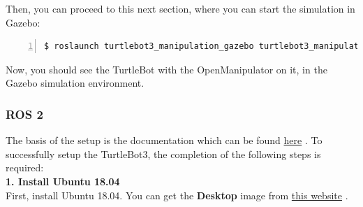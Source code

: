 \documentclass[plainarticle,zihtitle,english,final,hyperref,utf8]{zihpub}
\begin{document}
Then, you can proceed to this next section, where you can start the simulation in Gazebo:\\
\begin{Verbatim}[breaklines=true, breakanywhere=true, baselinestretch=1,fontsize=\scriptsize,numbers=left,frame=single,stepnumber=5,xleftmargin=1cm,xrightmargin=1cm]
$ roslaunch turtlebot3_manipulation_gazebo turtlebot3_manipulation_gazebo.launch
    \end{Verbatim}

Now, you should see the TurtleBot with the OpenManipulator on it, in the Gazebo simulation environment.
\newpage

\subsubsection{ROS 2}

The basis of the setup is the documentation which can be found \href{https://emanual.robotis.com/docs/en/platform/turtlebot3/ros2_setup}{here} \cite{ros2setup}. To successfully setup the TurtleBot3, the completion of the following steps is required:\\
\newline
\textbf{1. Install Ubuntu 18.04}\\
\newline
First, install Ubuntu 18.04. You can get the \textbf{Desktop} image from \href{http://releases.ubuntu.com/18.04/}{this website} \cite{ubuntu18}.
\newline
\end{document}
